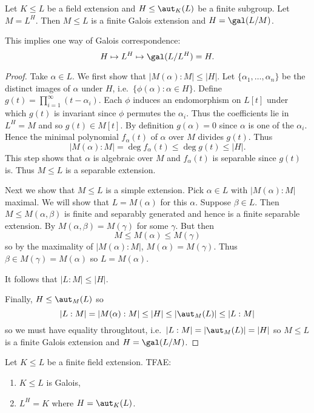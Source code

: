 \documentclass[a4paper]{article}
\begin{document}
\begin{theorem}[Artin's]
  \label{thm:artin}
  Let \(K \leq L\) be a field extension and \(H \leq \aut_K(L)\) be a finite subgroup. Let \(M = L^H\). Then \(M \leq L\) is a finite Galois extension and \(H = \gal(L/M)\).
\end{theorem}

\begin{remark}
  This implies one way of Galois correspondence:
  \[
    H \mapsto L^H \mapsto \gal(L/L^H) = H.
  \]
\end{remark}

\begin{proof}
  Take \(\alpha \in L\). We first show that \(|M(\alpha):M| \leq |H|\). Let \(\{\alpha_1, \dots, \alpha_n\}\) be the distinct images of \(\alpha\) under \(H\), i.e.\ \(\{\phi(\alpha): \alpha \in H\}\). Define \(g(t) = \prod_{i = 1}^{\infty} (t - \alpha_i) \). Each \(\phi\) induces an endomorphism on \(L[t]\) under which \(g(t)\) is invariant since \(\phi\) permutes the \(\alpha_i\). Thus the coefficients lie in \(L^H = M\) and so \(g(t) \in M[t]\). By definition \(g(\alpha) = 0\) since \(\alpha\) is one of the \(\alpha_i\). Hence the minimal polynomial \(f_\alpha(t)\) of \(\alpha\) over \(M\) divides \(g(t)\). Thus
  \[
    |M(\alpha):M| = \deg f_\alpha(t) \leq \deg g(t) \leq |H|.
  \]
  This step shows that \(\alpha\) is algebraic over \(M\) and \(f_\alpha(t)\) is separable since \(g(t)\) is. Thus \(M \leq L\) is a separable extension.

  Next we show that \(M \leq L\) is a simple extension. Pick \(\alpha \in L\) with \(|M(\alpha):M|\) maximal. We will show that \(L = M(\alpha)\) for this \(\alpha\). Suppose \(\beta \in L\). Then \(M \leq M(\alpha, \beta)\) is finite and separably generated and hence is a finite separable extension. By  \(M(\alpha, \beta) = M(\gamma)\) for some \(\gamma\). But then
  \[
    M \leq M(\alpha) \leq M(\gamma)
  \]
  so by the maximality of \(|M(\alpha):M|\), \(M(\alpha) = M(\gamma)\). Thus \(\beta \in M(\gamma) = M(\alpha)\) so \(L = M(\alpha)\).

  It follows that \(|L:M| \leq |H|\).

  Finally, \(H \leq \aut_M(L)\) so
  \[
    |L:M| = |M(\alpha):M| \leq |H| \leq |\aut_M(L)| \leq |L:M|
  \]
  so we must have equality throughtout, i.e.\ \(|L:M| = |\aut_M(L)| = |H|\) so \(M \leq L\) is a finite Galois extension and \(H = \gal(L/M)\).
\end{proof}

\begin{theorem}
  \label{thm:fixed field criterion for galois extension}
  Let \(K \leq L\) be a finite field extension. TFAE:
  \begin{enumerate}
  \item \(K \leq L\) is Galois,
  \item \(L^H = K\) where \(H = \aut_K(L)\).
  \end{enumerate}
\end{theorem}
\end{document}
